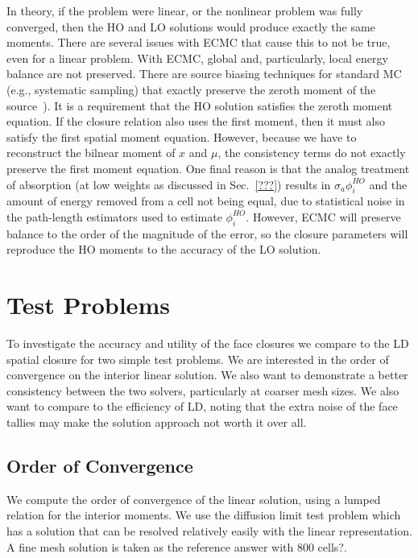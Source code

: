 In theory, if the problem were linear, or the nonlinear problem was fully converged,
then the HO and LO solutions would produce exactly the same moments.  There are
several issues with ECMC that cause this to not be true, even for a linear problem.
With ECMC, global and, particularly, local energy balance are not preserved.  There
are source biasing techniques for standard MC (e.g., systematic
sampling) that exactly preserve the zeroth moment of the source~\cite{shultis_mc}). 
It is a requirement that the HO solution satisfies the zeroth moment equation. If the
closure relation also uses the first moment, then it must also satisfy the first
spatial moment equation.  However, because we have to reconstruct the bilnear moment
of $x$ and $\mu$, the consistency terms do not exactly preserve the first moment
equation.  One final reason is that the analog treatment of absorption (at low
weights as discussed in Sec.~\ref{???}) results in $\sigma_a \phi^{HO}_i$ and the amount
of energy removed from a cell not being equal, due to statistical noise in the
path-length estimators used to estimate $\phi^{HO}_i$.  However, ECMC will preserve
balance to the order of the magnitude of the error, so the closure parameters will
reproduce the HO moments to the accuracy of the LO solution.

\section{Test Problems}

To investigate the accuracy and utility of the face closures we compare to the LD spatial
closure for two simple test problems.  We are interested in the order of convergence on the interior linear solution.
We also want to demonstrate a better consistency between the two solvers, particularly at
coarser mesh sizes.  We also want to compare to the efficiency of LD, noting that the
extra noise of the face tallies may make the solution approach not worth it over all.

\subsection{Order of Convergence}

We compute the order of convergence of the linear solution, using a lumped relation for
the interior moments.  We use the diffusion limit test problem which has a solution that
can be resolved relatively easily with the linear representation.  A fine mesh solution is
taken as the reference answer with 800 cells?.  

